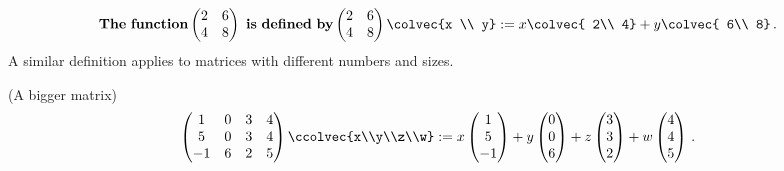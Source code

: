 \begin{equation*}
 {\rm {\bf The~function}}   \begin{pmatrix}
      2     & 6 \\
      4     & 8
    \end{pmatrix}~{\rm {\bf is~defined~by}}
    \begin{pmatrix}
      2     & 6 \\
      4     & 8
    \end{pmatrix}
  \colvec{x \\ y}
  := x \colvec{ 2\\ 4} + y \colvec{ 6\\ 8} \, .
\end{equation*}
A similar definition applies to matrices with different numbers and sizes.

\begin{example}(A bigger matrix)
$$
\begin{pmatrix}1&0&3&4\\
5&0&3&4\\
-1&6&2&5
\end{pmatrix}
\ccolvec{x\\y\\z\\w}
:=x
\begin{pmatrix}1\\5\\-1
\end{pmatrix}
+y
\begin{pmatrix}0\\0\\6
\end{pmatrix}
+z
\begin{pmatrix}3\\3\\2
\end{pmatrix}
+w\begin{pmatrix}4\\4\\5
\end{pmatrix}\, .
$$
\end{example}


